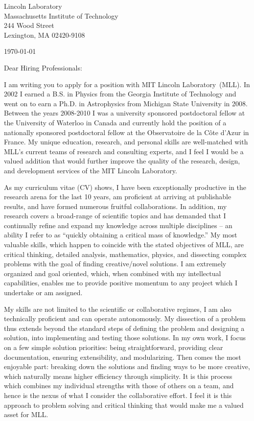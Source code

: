 \documentclass[12pt,letterpaper]{article}
\newcommand{\lab}{MIT Lincoln Laboratory}
\newcommand{\accro}{MLL}
\newcommand{\statement}{the quality of the research, design, and
  development services of the \lab}
\begin{document}
Lincoln Laboratory\\
Massachusetts Institute of Technology\\
244 Wood Street\\
Lexington, MA 02420-9108

\today

Dear Hiring Professionals:

I am writing you to apply for a position with \lab\ (\accro). In 2002
I earned a B.S. in Physics from the Georgia Institute of Technology
and went on to earn a Ph.D. in Astrophysics from Michigan State
University in 2008. Between the years 2008-2010 I was a university
sponsored postdoctoral fellow at the University of Waterloo in Canada
and currently hold the position of a nationally sponsored postdoctoral
fellow at the Observatoire de la C\^ote d'Azur in France. My unique
education, research, and personal skills are well-matched with
\accro's current teams of research and consulting experts, and I feel
I would be a valued addition that would further improve \statement.

As my curriculum vitae (CV) shows, I have been exceptionally
productive in the research arena for the last 10 years, am proficient
at arriving at publishable results, and have formed numerous fruitful
collaborations. In addition, my research covers a broad-range of
scientific topics and has demanded that I continually refine and
expand my knowledge across multiple disciplines -- an ability I refer
to as ``quickly obtaining a critical mass of knowledge.'' My most
valuable skills, which happen to coincide with the stated objectives
of \accro, are critical thinking, detailed analysis, mathematics,
physics, and dissecting complex problems with the goal of finding
creative/novel solutions. I am extremely organized and goal oriented,
which, when combined with my intellectual capabilities, enables me to
provide positive momentum to any project which I undertake or am
assigned.

My skills are not limited to the scientific or collaborative regimes,
I am also technically proficient and can operate autonomously. My
dissection of a problem thus extends beyond the standard steps of
defining the problem and designing a solution, into implementing and
testing those solutions. In my own work, I focus on a few simple
solution priorities: being straightforward, providing clear
documentation, ensuring extensibility, and modularizing. Then comes
the most enjoyable part: breaking down the solutions and finding ways
to be more creative, which naturally means higher efficiency through
simplicity. It is this process which combines my individual strengths
with those of others on a team, and hence is the nexus of what I
consider the collaborative effort. I feel it is this approach to
problem solving and critical thinking that would make me a valued
asset for \accro.
\end{document}
